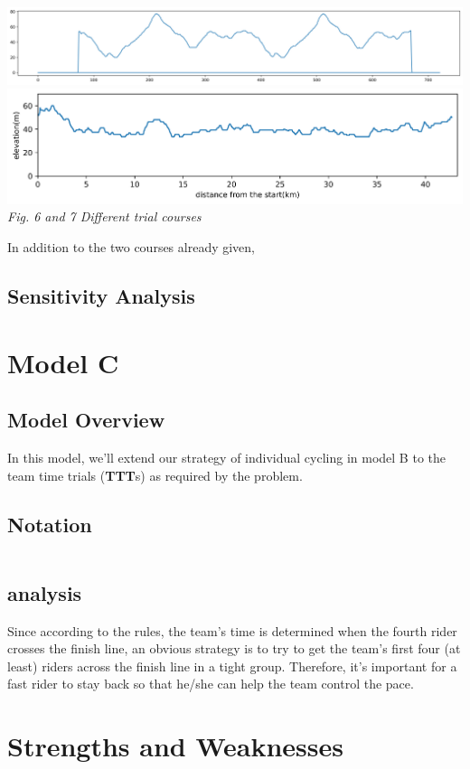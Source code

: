 \documentclass{article}
\begin{document}
		\begin{center}
			\includegraphics[width=15cm]{6.png}\\
			\includegraphics[width=15cm]{7.png}\\
			\small \textit{Fig. 6 and 7  Different trial courses}
		\end{center}
		In addition to the two courses already given,
		\subsection{Sensitivity Analysis}
	\section{Model C}
		\subsection{Model Overview}
			In this model, we'll extend our strategy of individual cycling in model B to the team time trials (\textbf{TTT}s) as required by the problem.
		\subsection{Notation}
			\begin{tabular}{|l|l|l|}
				\hline
			\end{tabular}
		\subsection{analysis}
			Since according to the rules, the team's time is determined when the fourth rider crosses the finish line, an obvious strategy is to try to get the team's first four (at least) riders across the finish line in a tight group. Therefore, it's important for a fast rider to stay back so that he/she can help the team control the pace.\cite{time trial strategy}
	\section{Strengths and Weaknesses}
\end{document}
